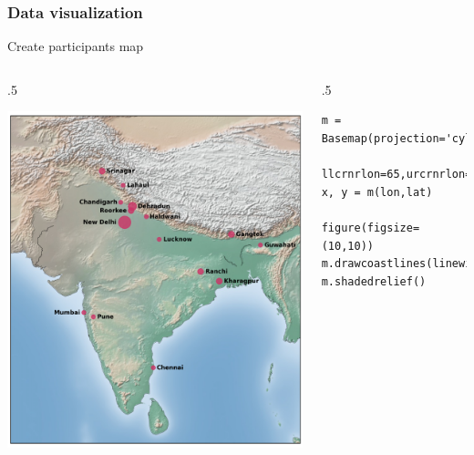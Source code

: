\documentclass{beamer}
\begin{document}
\begin{frame}[fragile]
\frametitle{Data visualization} 
\begin{center}
Create participants map\\ \end{center}

\begin{columns}[t]
\begin{column}{.5\textwidth}



\includegraphics[width=1\textwidth,angle=00]{participants_map.png}

\end{column}
\begin{column}{.5\textwidth}
\begin{lstlisting}
m = Basemap(projection='cyl',llcrnrlat=5,urcrnrlat=40,\
            llcrnrlon=65,urcrnrlon=96,resolution='l')
x, y = m(lon,lat)

figure(figsize=(10,10))
m.drawcoastlines(linewidth=0.25)
m.shadedrelief()
\end{lstlisting}
\end{column}
\end{columns}
\end{frame}
\end{document}
